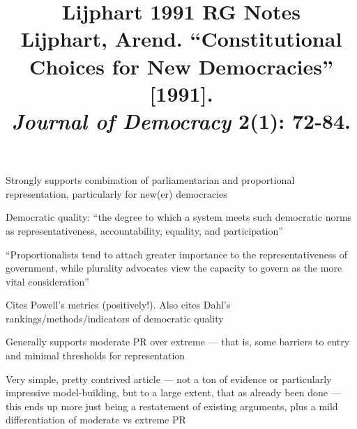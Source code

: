\documentclass[12pt]{article}
\title{\textbf{Lijphart 1991 RG Notes}\\
\large Lijphart, Arend. ``Constitutional Choices for New Democracies'' [1991].\\
\textit{Journal of Democracy} 2(1): 72-84.}
\author{}
\date{}
\begin{document}
\maketitle

Strongly supports combination of parliamentarian and proportional representation, particularly for new(er) democracies

Democratic quality: ``the degree to which a system meets such democratic norms as representativeness, accountability, equality, and participation''

``Proportionalists tend to attach greater importance to the representativeness of government, while plurality advocates view the capacity to govern as the more vital consideration''

Cites Powell's metrics (positively!). Also cites Dahl's rankings/methods/indicators of democratic quality

Generally supports moderate PR over extreme --- that is, some barriers to entry and minimal thresholds for representation

Very simple, pretty contrived article --- not a ton of evidence or particularly impressive model-building, but to a large extent, that as already been done --- this ends up more just being a restatement of existing arguments, plus a mild differentiation of moderate vs extreme PR
\end{document}
